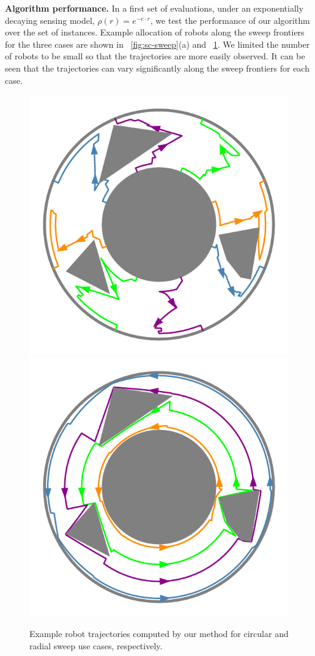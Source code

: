 \textbf{Algorithm performance.} In a first set of evaluations, under an exponentially 
decaying sensing 
model, $\rho(r) = e^{-c\cdot r}$, we test the performance of our algorithm over 
the set of instances. Example allocation of robots along the sweep frontiers for 
the three cases are shown in ~\ref{fig:sc-sweep}(a) and ~\ref{fig:sc-simulations}. 
We limited the number of robots to be small so that the trajectories are more easily 
observed. It can be seen that the trajectories can vary significantly along the 
sweep frontiers for each case. 
\begin{figure}[ht]
    \centering
    \includegraphics[width=.45\linewidth]{chapters/sc/fig/circular_sol-eps-converted-to.pdf}\hspace{2mm}
    \includegraphics[width=.45\linewidth]{chapters/sc/fig/rotational_sol-eps-converted-to.pdf}
    
    \caption[Example robot trajectories]{Example robot trajectories computed by our method for circular and radial 
    sweep use cases, respectively.
    }
    \label{fig:sc-simulations}
\end{figure}


